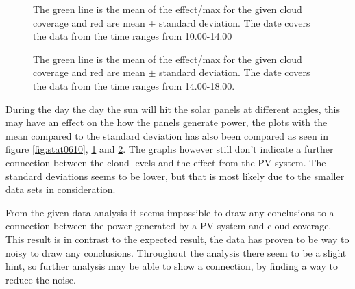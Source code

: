\begin{figure}
  \centering
  \tiny
  
  \caption{The green line is the mean of the effect/max for the given
    cloud coverage and red are mean $\pm$ standard deviation.  The
    date covers the data from the time ranges from 10.00-14.00}
  \label{fig:stat1014}
\end{figure}

\begin{figure}
  \centering
  \tiny
  
  \caption{The green line is the mean of the effect/max for the given
    cloud coverage and red are mean $\pm$ standard deviation.  The
    date covers the data from the time ranges from 14.00-18.00.}
  \label{fig:stat1418}
\end{figure}

During the day the day the sun will hit the solar panels at different
angles, this may have an effect on the how the panels generate power,
the plots with the mean compared to the standard deviation has also
been compared as seen in figure \ref{fig:stat0610}, \ref{fig:stat1014}
and \ref{fig:stat1418}.  The graphs however still don't indicate a
further connection between the cloud levels and the effect from the PV
system.  The standard deviations seems to be lower, but that is most
likely due to the smaller data sets in consideration.

From the given data analysis it seems impossible to draw any
conclusions to a connection between the power generated by a PV system
and cloud coverage.  This result is in contrast to the expected
result, the data has proven to be way to noisy to draw any
conclusions.  Throughout the analysis there seem to be a slight hint,
so further analysis may be able to show a connection, by finding a way
to reduce the noise.

